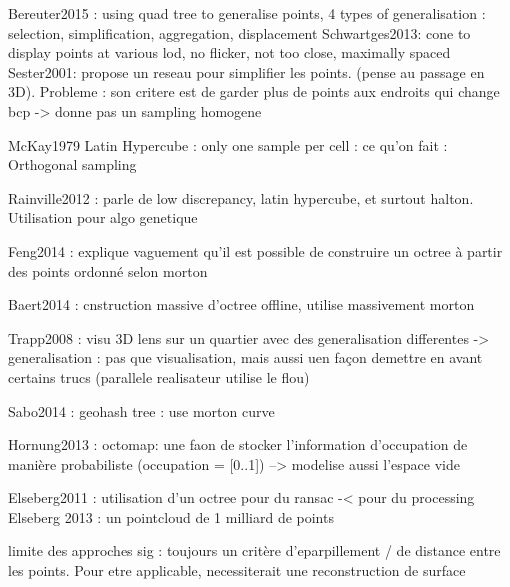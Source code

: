 		Bereuter2015 : using quad tree to generalise points, 4 types of generalisation : selection, simplification, aggregation, displacement
		Schwartges2013: cone to display points at various lod, no flicker, not too close, maximally spaced
		Sester2001: propose un reseau pour simplifier les points. (pense au passage en 3D). Probleme : son critere est de garder plus de points aux endroits qui change bcp -> donne pas un sampling homogene
		 
		McKay1979 Latin Hypercube : only one sample per cell : ce qu'on fait : Orthogonal sampling
		
		Rainville2012 : parle de low discrepancy, latin hypercube, et surtout halton. Utilisation pour algo genetique
		
		Feng2014 : explique vaguement qu'il est possible de construire un octree à partir des points ordonné selon morton
	
		Baert2014 : cnstruction massive d'octree offline, utilise massivement morton
		
		Trapp2008 : visu 3D lens sur un quartier avec des generalisation differentes -> generalisation : pas que visualisation, mais aussi uen façon demettre en avant certains trucs (parallele realisateur utilise le flou)
		
		Sabo2014 : geohash tree : use morton curve
		
		Hornung2013 : octomap: une faon de stocker l'information d'occupation de manière probabiliste (occupation = [0..1]) --> modelise aussi l'espace vide 
		
		Elseberg2011 : utilisation d'un octree pour du ransac -< pour du processing
		Elseberg 2013 : un pointcloud de 1 milliard de points
		
		limite des approches sig : toujours un critère d'eparpillement / de  distance entre les points. Pour etre applicable,  necessiterait une reconstruction de surface
		
		
		
		
		
        
        
        
        
